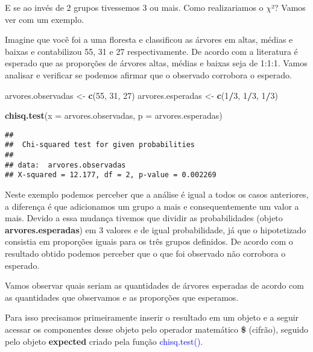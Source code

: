 \documentclass[14pt,titlepage, oneside, openany, a4paper]{book}
\newenvironment{Shaded}{\begin{snugshade}}{\end{snugshade}}
\newcommand{\DataTypeTok}[1]{\textcolor[rgb]{0.13,0.29,0.53}{#1}}
\newcommand{\DecValTok}[1]{\textcolor[rgb]{0.00,0.00,0.81}{#1}}
\newcommand{\KeywordTok}[1]{\textcolor[rgb]{0.13,0.29,0.53}{\textbf{#1}}}
\newcommand{\NormalTok}[1]{#1}
\newcommand{\OperatorTok}[1]{\textcolor[rgb]{0.81,0.36,0.00}{\textbf{#1}}}
\newcommand{\StringTok}[1]{\textcolor[rgb]{0.31,0.60,0.02}{#1}}
\begin{document}
E se ao invés de 2 grupos tivessemos 3 ou mais. Como realizariamos o \(\chi\)²? Vamos ver com um exemplo.

Imagine que você foi a uma floresta e classificou as árvores em altas, médias e baixas e contabilizou 55, 31 e 27 respectivamente. De acordo com a literatura é esperado que as proporções de árvores altas, médias e baixas seja de 1:1:1. Vamos analisar e verificar se podemos afirmar que o observado corrobora o esperado.

\begin{Shaded}
\begin{Highlighting}[]
\NormalTok{arvores.observadas <-}\StringTok{ }\KeywordTok{c}\NormalTok{(}\DecValTok{55}\NormalTok{, }\DecValTok{31}\NormalTok{, }\DecValTok{27}\NormalTok{)}
\NormalTok{arvores.esperadas <-}\StringTok{ }\KeywordTok{c}\NormalTok{(}\DecValTok{1}\OperatorTok{/}\DecValTok{3}\NormalTok{, }\DecValTok{1}\OperatorTok{/}\DecValTok{3}\NormalTok{, }\DecValTok{1}\OperatorTok{/}\DecValTok{3}\NormalTok{)}

\KeywordTok{chisq.test}\NormalTok{(}\DataTypeTok{x =}\NormalTok{ arvores.observadas, }\DataTypeTok{p =}\NormalTok{ arvores.esperadas)}
\end{Highlighting}
\end{Shaded}

\begin{verbatim}
## 
##  Chi-squared test for given probabilities
## 
## data:  arvores.observadas
## X-squared = 12.177, df = 2, p-value = 0.002269
\end{verbatim}

Neste exemplo podemos perceber que a análise é igual a todos os casos anteriores, a diferença é que adicionamos um grupo a mais e consequentemente um valor a mais. Devido a essa mudança tivemos que dividir as probabilidades (objeto \textbf{arvores.esperadas}) em 3 valores e de igual probabilidade, já que o hipotetizado consistia em proporções iguais para os três grupos definidos. De acordo com o resultado obtido podemos perceber que o que foi observado não corrobora o esperado.

Vamos observar quais seriam as quantidades de árvores esperadas de acordo com as quantidades que observamos e as proporções que esperamos.

Para isso precisamos primeiramente inserir o resultado em um objeto e a seguir acessar os componentes desse objeto pelo operador matemático \textbf{\$} (cifrão), seguido pelo objeto \textbf{expected} criado pela função \textcolor{blue}{chisq.test()}.
\end{document}
